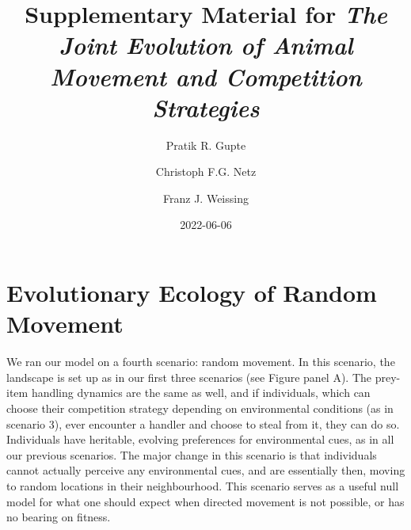 \documentclass[]{article}
\title{Supplementary Material for \emph{The Joint Evolution of Animal Movement and Competition Strategies}}
\author{Pratik R. Gupte \and Christoph F.G. Netz \and Franz J. Weissing}
\date{2022-06-06}
\begin{document}
\maketitle

{
\setcounter{tocdepth}{2}
\tableofcontents
}
\newpage

\hypertarget{evolutionary-ecology-of-random-movement}{%
\section{Evolutionary Ecology of Random Movement}\label{evolutionary-ecology-of-random-movement}}

We ran our model on a fourth scenario: random movement.
In this scenario, the landscape is set up as in our first three scenarios (see Figure panel A).
The prey-item handling dynamics are the same as well, and if individuals, which can choose their competition strategy depending on environmental conditions (as in scenario 3), ever encounter a handler and choose to steal from it, they can do so.
Individuals have heritable, evolving preferences for environmental cues, as in all our previous scenarios.
The major change in this scenario is that individuals cannot actually perceive any environmental cues, and are essentially then, moving to random locations in their neighbourhood.
This scenario serves as a useful null model for what one should expect when directed movement is not possible, or has no bearing on fitness.
\end{document}
